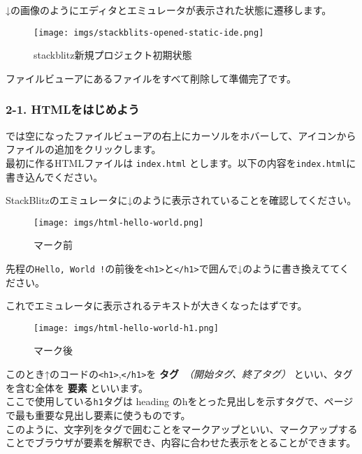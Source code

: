 ↓の画像のようにエディタとエミュレータが表示された状態に遷移します。

\begin{figure}
\centering
\texttt{[image: imgs/stackblits-opened-static-ide.png]}
\caption{stackblitz新規プロジェクト初期状態}
\end{figure}

ファイルビューアにあるファイルをすべて削除して準備完了です。

\subsubsection{2-1.
HTMLをはじめよう}\label{htmlux3092ux306fux3058ux3081ux3088ux3046}

では空になったファイルビューアの右上にカーソルをホバーして、アイコンからファイルの追加をクリックします。\\
最初に作るHTMLファイルは \texttt{index.html}
とします。以下の内容を\texttt{index.html}に書き込んでください。

\begin{Shaded}
\begin{Highlighting}[]
\end{Highlighting}
\end{Shaded}

StackBlitzのエミュレータに↓のように表示されていることを確認してください。

\begin{figure}
\centering
\texttt{[image: imgs/html-hello-world.png]}
\caption{マーク前}
\end{figure}

先程の\texttt{Hello,\ World\ !}の前後を\texttt{\textless{}h1\textgreater{}}と\texttt{\textless{}/h1\textgreater{}}で囲んで↓のように書き換えててください。

\begin{Shaded}
\begin{Highlighting}[]
\end{Highlighting}
\end{Shaded}

これでエミュレータに表示されるテキストが大きくなったはずです。

\begin{figure}
\centering
\texttt{[image: imgs/html-hello-world-h1.png]}
\caption{マーク後}
\end{figure}

このとき↑のコードの\texttt{\textless{}h1\textgreater{}},\texttt{\textless{}/h1\textgreater{}}を
\textbf{タグ}　\emph{（開始タグ、終了タグ）} といい、タグを含む全体を
\textbf{要素} といいます。\\
ここで使用している\texttt{h1}タグは heading
のhをとった見出しを示すタグで、ページで最も重要な見出し要素に使うものです。\\
このように、文字列をタグで囲むことをマークアップといい、マークアップすることでブラウザが要素を解釈でき、内容に合わせた表示をとることができます。

